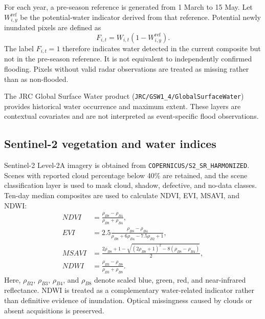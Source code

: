 \documentclass[pdflatex,sn-mathphys,Numbered]{sn-jnl}
\begin{document}
For each year, a pre-season reference is generated from 1 March to 15 May. Let $W^{\mathrm{ref}}_{i,y}$ be the potential-water indicator derived from that reference. Potential newly inundated pixels are defined as
\begin{equation}
F_{i,t}=W_{i,t}\left(1-W^{\mathrm{ref}}_{i,y}\right).
\label{eq:flood}
\end{equation}
The label $F_{i,t}=1$ therefore indicates water detected in the current composite but not in the pre-season reference. It is not equivalent to independently confirmed flooding. Pixels without valid radar observations are treated as missing rather than as non-flooded.

The JRC Global Surface Water product (\texttt{JRC/GSW1\_4/GlobalSurfaceWater}) provides historical water occurrence and maximum extent. These layers are contextual covariates and are not interpreted as event-specific flood observations.

\subsection{Sentinel-2 vegetation and water indices}
Sentinel-2 Level-2A imagery is obtained from \texttt{COPERNICUS/S2\_SR\_HARMONIZED}. Scenes with reported cloud percentage below 40\% are retained, and the scene classification layer is used to mask cloud, shadow, defective, and no-data classes. Ten-day median composites are used to calculate NDVI, EVI, MSAVI, and NDWI:
\begin{align}
NDVI &= \frac{\rho_{B8}-\rho_{B4}}{\rho_{B8}+\rho_{B4}},\\
EVI &= 2.5\frac{\rho_{B8}-\rho_{B4}}{\rho_{B8}+6\rho_{B4}-7.5\rho_{B2}+1},\\
MSAVI &= \frac{2\rho_{B8}+1-\sqrt{(2\rho_{B8}+1)^2-8(\rho_{B8}-\rho_{B4})}}{2},\\
NDWI &= \frac{\rho_{B3}-\rho_{B8}}{\rho_{B3}+\rho_{B8}}.
\end{align}
Here, $\rho_{B2}$, $\rho_{B3}$, $\rho_{B4}$, and $\rho_{B8}$ denote scaled blue, green, red, and near-infrared reflectance. NDWI is treated as a complementary water-related indicator rather than definitive evidence of inundation. Optical missingness caused by clouds or absent acquisitions is preserved.
\end{document}
